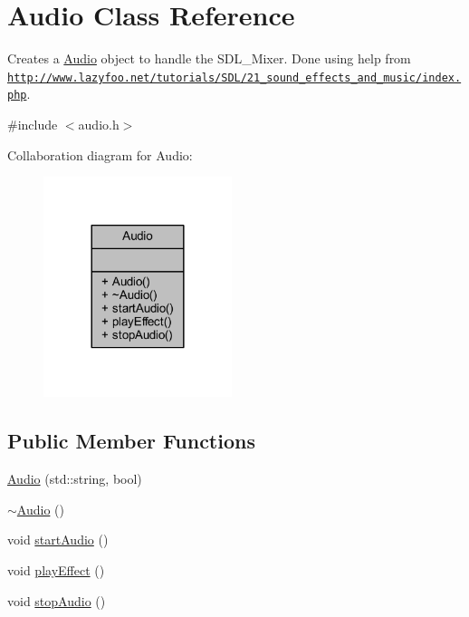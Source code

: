 \hypertarget{class_audio}{\section{Audio Class Reference}
\label{class_audio}
}


Creates a \hyperlink{class_audio}{Audio} object to handle the S\+D\+L\+\_\+\+Mixer. Done using help from \href{http://www.lazyfoo.net/tutorials/SDL/21_sound_effects_and_music/index.php}{\tt http\+://www.\+lazyfoo.\+net/tutorials/\+S\+D\+L/21\+\_\+sound\+\_\+effects\+\_\+and\+\_\+music/index.\+php}.  




{\ttfamily \#include $<$audio.\+h$>$}



Collaboration diagram for Audio\+:
\nopagebreak
\begin{figure}[H]
\begin{center}
\leavevmode
\includegraphics[width=156pt]{class_audio__coll__graph}
\end{center}
\end{figure}
\subsection*{Public Member Functions}
\begin{DoxyCompactItemize}
\item 
\hyperlink{class_audio_ae1900ee0e5254fe0c96e0b423ea02777}{Audio} (std\+::string, bool)
\item 
\hyperlink{class_audio_ae8f54deecb5f48511aaab469e80294d6}{$\sim$\+Audio} ()
\item 
void \hyperlink{class_audio_a15f1ea89039f6dbbb2260bb34f9dabdd}{start\+Audio} ()
\item 
void \hyperlink{class_audio_aea41cc6feaed4b1ab5957ea499509f55}{play\+Effect} ()
\item 
void \hyperlink{class_audio_a5d73ae24c80b37df5f167016de9c9296}{stop\+Audio} ()
\end{DoxyCompactItemize}


